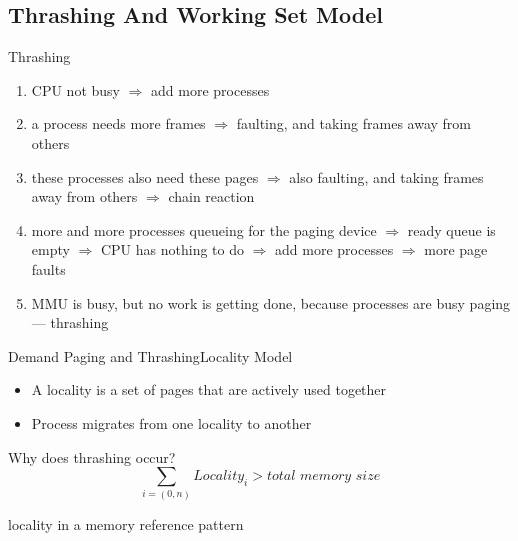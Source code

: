\subsection{Thrashing And Working Set Model}

\begin{frame}{Thrashing}
  \begin{minipage}{.38\linewidth}
  \end{minipage}
  \begin{minipage}{.6\linewidth}
    \begin{enumerate}
    \item CPU not busy $\Rightarrow$ add more processes
    \item a process needs more frames $\Rightarrow$ faulting, and taking frames away from
      others
    \item these processes also need these pages $\Rightarrow$ also faulting, and taking
      frames away from others $\Rightarrow$ chain reaction
    \item more and more processes queueing for the paging device $\Rightarrow$ ready queue
      is empty $\Rightarrow$ CPU has nothing to do $\Rightarrow$ add more processes
      $\Rightarrow$ more page faults
    \item MMU is busy, but no work is getting done, because processes are busy paging ---
      \alert{thrashing}
    \end{enumerate}
  \end{minipage}
\end{frame}

\begin{frame}{Demand Paging and Thrashing}{Locality Model}
  \begin{minipage}{.65\textwidth}
    \begin{itemize}
    \item A \alert{locality} is a set of pages that are actively used together
    \item Process migrates from one locality to another
    \end{itemize}
    \begin{iblock}{Why does thrashing occur?}
      \[\sum_{i=(0,n)}Locality_i > \textit{total memory size}\]
    \end{iblock}
  \end{minipage}\hfill
  \begin{minipage}{.3\textwidth}
     {\tiny locality in a
      memory reference pattern}
  \end{minipage}  
\end{frame}

